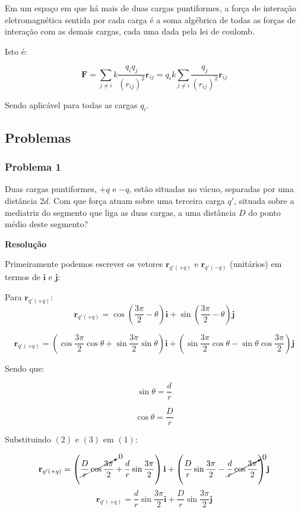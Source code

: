 \documentclass[a4paper, 12pt]{article}
\begin{document}
	Em um espaço em que há mais de duas cargas puntiformes, a força de interação eletromagnética sentida por cada carga é a soma algébrica de todas as forças de interação com as demais cargas, cada uma dada pela lei de coulomb. 
	
	Isto é:
	
	\[
	\textbf{F}=\sum_{j\ne i} k\frac{q_iq_j}{(r_{ij})^2}\textbf{r}_{ij} =q_ik \sum_{j\ne i} \frac{q_j}{(r_{ij})^2}\textbf{r}_{ij}
	\]
	
	Sendo aplicável para todas as cargas $q_i$.
	
	\subsection{Problemas}
	\subsubsection{Problema 1}
	Duas cargas puntiformes, $+q$ e $-q$, estão situadas no vácuo, separadas por uma distância $2d$. Com que força atuam sobre uma terceira carga $q'$, situada sobre a mediatriz do segmento que liga as duas cargas, a uma distância $D$ do ponto médio deste segmento?
	
	\textbf{Resolução}
	
	
	
	Primeiramente podemos escrever os vetores $\textbf{r}_{q'(+q)}$ e $\textbf{r}_{q'(-q)}$ (unitários) em termos de $\textbf{i}$ e $\textbf{j}$:
	
	
	Para $\textbf{r}_{q'(+q)}$:
	\[
	\textbf{r}_{q'(+q)}=\cos{\left(\frac{3\pi}{2}-\theta\right)}\textbf{i}+\sin{\left(\frac{3\pi}{2}-\theta\right)}\textbf{j}
	\]
	
	\begin{equation}
		\textbf{r}_{q'(+q)}=\left(\cos\frac{3\pi}{2}\cos\theta+\sin\frac{3\pi}{2}\sin\theta\right)\textbf{i}+\left(\sin{\frac{3\pi}{2}}\cos{\theta}-\sin{\theta}\cos{\frac{3\pi}{2}}\right)\textbf{j}
	\end{equation}
	
	Sendo que:
	
	\begin{equation}
		\sin\theta=\frac{d}{r}
	\end{equation}
	
	\begin{equation}
		\cos\theta=\frac{D}{r}
	\end{equation}
	
	Substituindo $(2)$ e $(3)$ em $(1)$:
	
	\[
	\textbf{r}_{q'(+q)}=\left(\cancelto{0}{\frac{D}{r}\cos\frac{3\pi}{2}}+\frac{d}{r}\sin\frac{3\pi}{2}\right)\textbf{i}+\left(\frac{D}{r}\sin{\frac{3\pi}{2}}-\cancelto{0}{\frac{d}{r}\cos{\frac{3\pi}{2}}}\right)\textbf{j}
	\]
	\[
	\textbf{r}_{q'(+q)}=\frac{d}{r}\sin\frac{3\pi}{2}\textbf{i}+\frac{D}{r}\sin{\frac{3\pi}{2}}\textbf{j}
	\]
	
\end{document}
